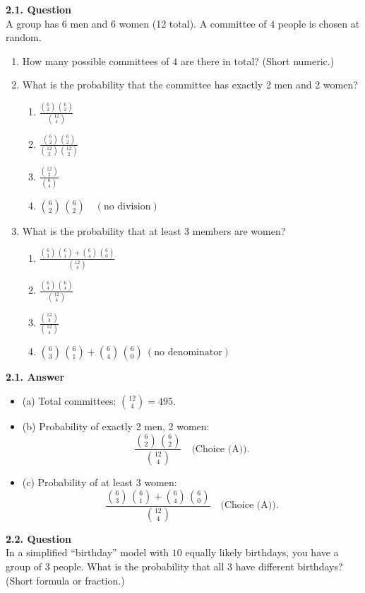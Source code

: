 \documentclass[12pt]{article}
\begin{document}
\textbf{2.1. Question}\\
A group has $6$ men and $6$ women (12 total). A committee of $4$ people is chosen at random.
\begin{enumerate}[label=(\alph*)]
\item How many possible committees of $4$ are there in total? (Short numeric.)
\item What is the probability that the committee has exactly 2 men and 2 women?  
  \begin{enumerate}[label=\Alph*.]
  \item $\displaystyle \frac{\binom{6}{2}\,\binom{6}{2}}{\binom{12}{4}}$
  \item $\displaystyle \frac{\binom{6}{2}\,\binom{6}{2}}{\binom{12}{2}\,\binom{12}{2}}$
  \item $\displaystyle \frac{\binom{12}{2}}{\binom{6}{4}}$
  \item $\displaystyle \binom{6}{2}\,\binom{6}{2}\quad (\text{no division})$
  \end{enumerate}
\item What is the probability that at least 3 members are women?
  \begin{enumerate}[label=\Alph*.]
  \item $\displaystyle \frac{\binom{6}{3}\,\binom{6}{1} + \binom{6}{4}\,\binom{6}{0}}{\binom{12}{4}}$
  \item $\displaystyle \frac{\binom{6}{4}\,\binom{6}{4}}{\binom{12}{4}}$
  \item $\displaystyle \frac{\binom{12}{3}}{\binom{12}{4}}$
  \item $\displaystyle \binom{6}{3}\,\binom{6}{1} + \binom{6}{4}\,\binom{6}{0}\ (\text{no denominator})$
  \end{enumerate}
\end{enumerate}

\noindent
\textbf{2.1. Answer}
\begin{itemize}
\item (a) Total committees: $\binom{12}{4}=495.$
\item (b) Probability of exactly 2 men, 2 women:
  \[
    \frac{\binom{6}{2}\,\binom{6}{2}}{\binom{12}{4}} \quad\text{(Choice (A))}.
  \]
\item (c) Probability of at least 3 women:
  \[
    \frac{\binom{6}{3}\,\binom{6}{1} + \binom{6}{4}\,\binom{6}{0}}{\binom{12}{4}} 
    \quad\text{(Choice (A))}.
  \]
\end{itemize}

\textbf{2.2. Question}\\
In a simplified ``birthday'' model with $10$ equally likely birthdays, you have a group of $3$ people.  
What is the probability that all $3$ have different birthdays? (Short formula or fraction.)
\end{document}
